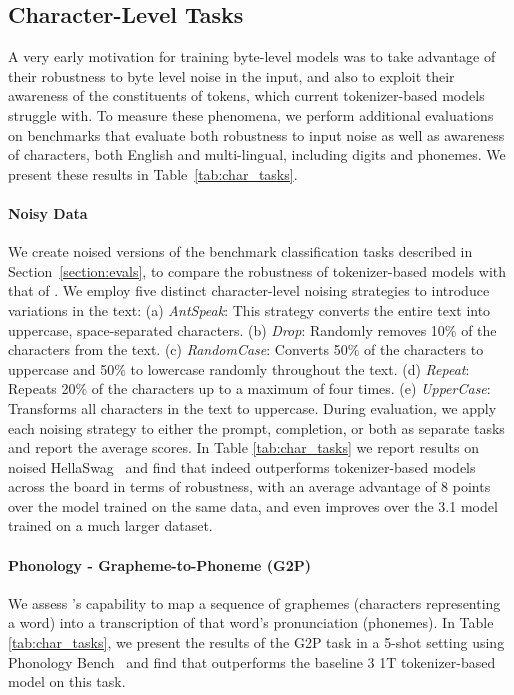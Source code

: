 \documentclass[]{fairmeta}
\begin{document}
\subsection{Character-Level Tasks}


A very early motivation for training byte-level models was to take advantage of their robustness to byte level noise in the input, and also to exploit their awareness of the constituents of tokens, which current tokenizer-based models struggle with. To measure these phenomena, we perform additional evaluations on benchmarks that evaluate both robustness to input noise as well as awareness of characters, both English and multi-lingual, including digits and phonemes. We present these results in Table~\ref{tab:char_tasks}.


\paragraph{Noisy Data} We create noised versions of the benchmark classification tasks described in Section~\ref{section:evals}, to compare the robustness of tokenizer-based models with that of \model{}.
We employ five distinct character-level noising strategies to introduce variations in the text: (a) \textit{AntSpeak}: This strategy converts the entire text into uppercase, space-separated characters. (b) \textit{Drop}: Randomly removes 10\% of the characters from the text. (c) \textit{RandomCase}: Converts 50\% of the characters to uppercase and 50\% to lowercase randomly throughout the text. (d) \textit{Repeat}:  Repeats 20\% of the characters up to a maximum of four times. (e) \textit{UpperCase}: Transforms all characters in the text to uppercase.
During evaluation, we apply each noising strategy to either the prompt, completion, or both as separate tasks and report the average scores. In Table \ref{tab:char_tasks} we report results on noised HellaSwag~\citep{Eval_hellaswag} and find that \model{} indeed outperforms tokenizer-based models across the board in terms of robustness, with an average advantage of 8 points over the model trained on the same data, and even improves over the \llama{} 3.1 model trained on a much larger dataset.


\paragraph{Phonology - Grapheme-to-Phoneme (G2P)}
We assess \model{}'s capability to map a sequence of graphemes (characters representing a word) into a transcription of that word's pronunciation (phonemes). In Table \ref{tab:char_tasks}, we present the results of the G2P task in a 5-shot setting using Phonology Bench~\citep{suvarna2024phonologybench} and find that \model{} outperforms the baseline \llama{} 3 1T tokenizer-based model on this task.
\end{document}
